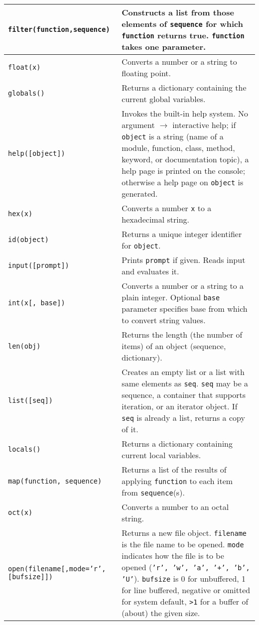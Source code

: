 {\begin{longtable}{|l|p{9cm}|}
\hline
\tt filter(function,sequence) 	& Constructs a list from those elements of {\tt sequence} for which {\tt function} returns true. 
				  {\tt function} takes one parameter.\\
\hline
\tt float(x) 		& Converts a number or a string to floating point.\\
\hline
\tt globals() 		& Returns a dictionary containing the current global variables.\\
\hline
\tt help([object]) 	& Invokes the built-in help system. No argument $\rightarrow$ interactive help; if {\tt object} is a string 
			  (name of a module, function, class, method, keyword, or documentation topic), a help page is printed on the console; 
			  otherwise a help page on {\tt object} is generated.\\
\hline
\tt hex(x) 		& Converts a number {\tt x} to a hexadecimal string.\\
\hline
\tt id(object) 		& Returns a unique integer identifier for {\tt object}.\\ 
\hline
\tt input([prompt]) 	& Prints {\tt prompt} if given. Reads input and evaluates it.\\
\hline
\tt int(x[, base]) 	& Converts a number or a string to a plain integer. Optional {\tt base} parameter specifies base from which 
			  to convert string values.\\
\hline
\tt len(obj) 		& Returns the length (the number of items) of an object (sequence, dictionary).\\
\hline
\tt list([seq]) 	& Creates an empty list or a list with same elements as {\tt seq}. 
			  {\tt seq} may be a sequence, a container that supports iteration, or an iterator object. 
			  If {\tt seq} is already a list, returns a copy of it.\\
\hline
\tt locals() 		& Returns a dictionary containing current local variables.\\
\hline
\tt map(function, sequence)	& Returns a list of the results of applying {\tt function} to each item from {\tt sequence}(s).\\
\hline
\tt oct(x) 		& Converts a number to an octal string.\\
\hline
\tt open(filename[,mode='r',[bufsize]])	& Returns a new file object. {\tt filename} is the file name to be opened.
						  {\tt mode} indicates how the file is to be opened ({\tt 'r', 'w', 'a', '+', 'b', 'U'}).
						  {\tt bufsize} is 0 for unbuffered, 1 for line buffered, 
						  negative or omitted for system default, {\tt >1} for a buffer of (about) the given size.\\

\end{longtable}}
